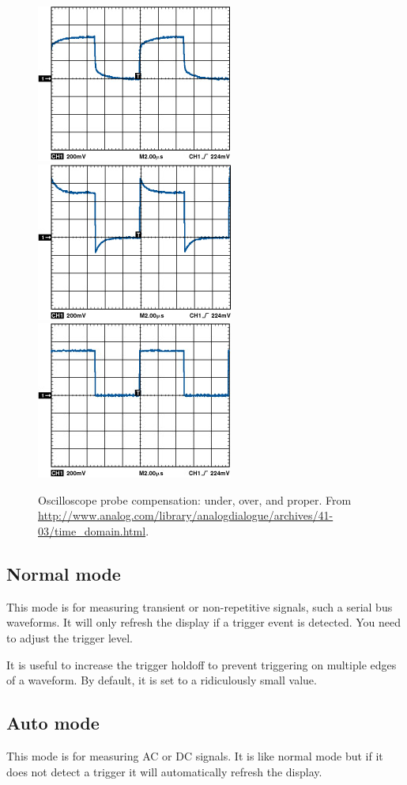 \begin{figure}[!h]
  \centering
  \includegraphics[width=0.3\columnwidth]{figs/probe-undercompensated}
  \includegraphics[width=0.3\columnwidth]{figs/probe-overcompensated}
  \includegraphics[width=0.3\columnwidth]{figs/probe-compensated}
  \caption{Oscilloscope probe compensation: under, over, and proper.
    From
    \url{http://www.analog.com/library/analogdialogue/archives/41-03/time_domain.html}.}
\end{figure}


\subsection{Normal mode}
\label{normal-mode}

This mode is for measuring transient or non-repetitive signals, such a
serial bus waveforms. It will only refresh the display if a trigger
event is detected.  You need to adjust the trigger level.

It is useful to increase the trigger holdoff to prevent triggering on
multiple edges of a waveform.  By default, it is set to a ridiculously
small value.

\subsection{Auto mode}
\label{auto-mode}

This mode is for measuring AC or DC signals. It is like normal mode
but if it does not detect a trigger it will automatically refresh the
display.

